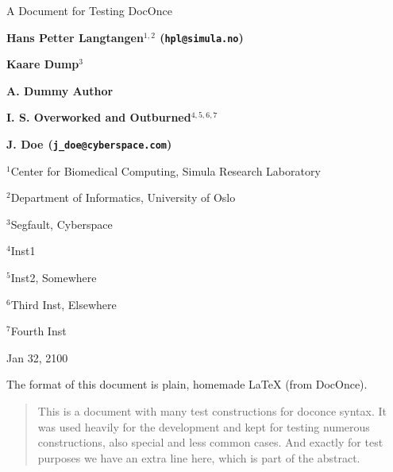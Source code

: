 \documentclass[%
oneside,                 %
final,                   %
10pt]{article}
\theoremstyle{definition}
\begin{document}
\newcommand{\exercisesection}[1]{\subsection*{#1}}


\thispagestyle{empty}
\begin{center}
{\LARGE\bf
\begin{spacing}{1.25}
A Document for Testing DocOnce
\end{spacing}
}
\end{center}
\begin{center}
{\bf Hans Petter Langtangen${}^{1, 2}$ (\texttt{hpl@simula.no})} \\ [0mm]
\end{center}
\begin{center}
{\bf Kaare Dump${}^{3}$} \\ [0mm]
\end{center}
\begin{center}
{\bf A. Dummy Author${}^{}$} \\ [0mm]
\end{center}
\begin{center}
{\bf I. S. Overworked and Outburned${}^{4, 5, 6, 7}$} \\ [0mm]
\end{center}
\begin{center}
{\bf J. Doe${}^{}$ (\texttt{j\_doe@cyberspace.com})} \\ [0mm]
\end{center}
\begin{center}
\centerline{{\small ${}^1$Center for Biomedical Computing, Simula Research Laboratory}}
\centerline{{\small ${}^2$Department of Informatics, University of Oslo}}
\centerline{{\small ${}^3$Segfault, Cyberspace}}
\centerline{{\small ${}^4$Inst1}}
\centerline{{\small ${}^5$Inst2, Somewhere}}
\centerline{{\small ${}^6$Third Inst, Elsewhere}}
\centerline{{\small ${}^7$Fourth Inst}}
\end{center}
    
\begin{center}
Jan 32, 2100
\end{center}
\vspace{1cm}
\tableofcontents
\vspace{1cm} %
The format of this document is
plain, homemade {\LaTeX} (from DocOnce).
\begin{abstract}
This is a document with many test constructions for doconce syntax.
It was used heavily for the development and kept for testing
numerous constructions, also special and less common cases.
And exactly for test purposes we have an extra line here, which
is part of the abstract.
\end{abstract}
\end{document}
